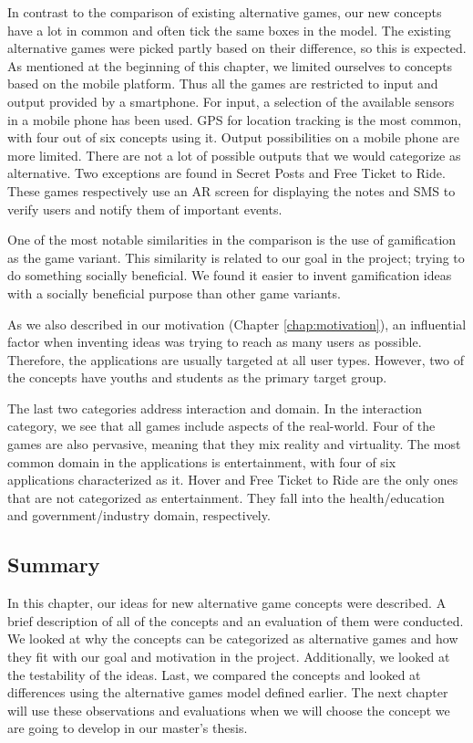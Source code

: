 In contrast to the comparison of existing alternative games, our new concepts have a lot in common and often tick the same boxes in the model. The existing alternative games were picked partly based on their difference, so this is expected. As mentioned at the beginning of this chapter, we limited ourselves to concepts based on the mobile platform. Thus all the games are restricted to input and output provided by a smartphone. For input, a selection of the available sensors in a mobile phone has been used. GPS for location tracking is the most common, with four out of six concepts using it. Output possibilities on a mobile phone are more limited. There are not a lot of possible outputs that we would categorize as alternative. Two exceptions are found in Secret Posts and Free Ticket to Ride. These games respectively use an AR screen for displaying the notes and SMS to verify users and notify them of important events.

One of the most notable similarities in the comparison is the use of gamification as the game variant. This similarity is related to our goal in the project; trying to do something socially beneficial. We found it easier to invent gamification ideas with a socially beneficial purpose than other game variants.

As we also described in our motivation (Chapter \ref{chap:motivation}), an influential factor when inventing ideas was trying to reach as many users as possible. Therefore, the applications are usually targeted at all user types. However, two of the concepts have youths and students as the primary target group.

The last two categories address interaction and domain. In the interaction category, we see that all games include aspects of the real-world. Four of the games are also pervasive, meaning that they mix reality and virtuality. The most common domain in the applications is entertainment, with four of six applications characterized as it. Hover and Free Ticket to Ride are the only ones that are not categorized as entertainment. They fall into the health/education and government/industry domain, respectively.

\subsection{Summary}
In this chapter, our ideas for new alternative game concepts were described. A brief description of all of the concepts and an evaluation of them were conducted. We looked at why the concepts can be categorized as alternative games and how they fit with our goal and motivation in the project. Additionally, we looked at the testability of the ideas. Last, we compared the concepts and looked at differences using the alternative games model defined earlier. The next chapter will use these observations and evaluations when we will choose the concept we are going to develop in our master’s thesis.
